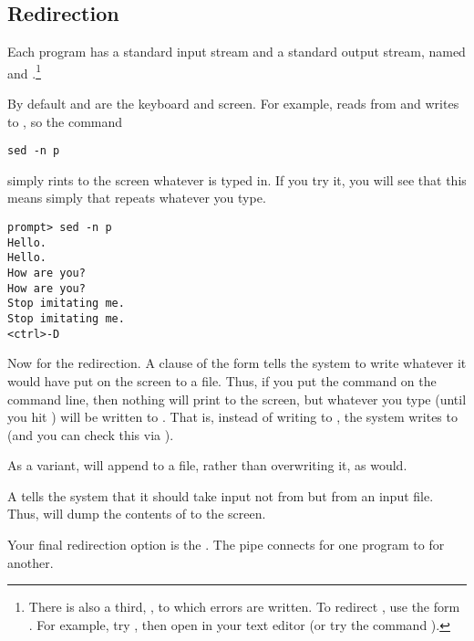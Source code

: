 

\subsection{Redirection} 
Each program has a standard input stream
and a standard output stream, named  and
.\footnote{There is also a third, , to which
errors are written. To redirect , use the form \bi{\&>}. For
example, try , then open  in your text editor
(or try the command ).}

By default  and  are the keyboard and screen. 
For example,  reads from  and writes to ,
so the command
\begin{lstlisting}
sed -n p
\end{lstlisting}
simply rints to the screen whatever is typed in. If you
try it, you will see that this means simply that  repeats
whatever you type.
\begin{lstlisting}
prompt> sed -n p
Hello.
Hello.
How are you?
How are you?
Stop imitating me.
Stop imitating me.
<ctrl>-D
\end{lstlisting}
Now for the redirection. A clause of the form  tells the
system to write whatever it would have put on the screen to a file. Thus,
if you put the command  on the command line, then
nothing will print to the screen, but whatever you type (until you hit
) will be written to . That is, instead of
writing to , the system writes to  (and you can
check this via ).

As a variant, \bind{>>}  will append to a file, rather than
overwriting it, as  would.

A \bind{<} tells the system that it should take input not from 
but from an input file. Thus,  will dump the
contents of  to the screen. 


Your final redirection option is the . The pipe connects 
for one program to  for another. 

